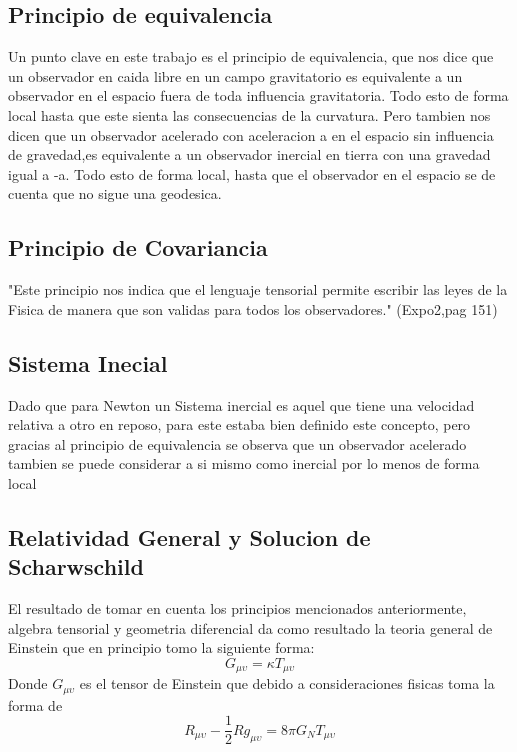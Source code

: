 \documentclass[12pt,twoside]{rif}
\begin{document}
	\subsection{Principio de equivalencia}
	Un punto clave en este trabajo es el principio de equivalencia, que nos dice que un observador en caida libre en un campo gravitatorio es equivalente a un observador en el espacio fuera de toda influencia gravitatoria. Todo esto de forma local hasta que este sienta las consecuencias de la curvatura. Pero tambien nos dicen que un observador acelerado con aceleracion a en el espacio sin influencia de gravedad,es equivalente a un observador inercial en tierra con una gravedad igual a -a. Todo esto de forma local, hasta que el observador en el espacio se de cuenta que no sigue una geodesica.
	
	\subsection{Principio de Covariancia}
	"Este principio nos indica que el lenguaje tensorial permite escribir las leyes de la Fisica de manera que son validas para todos los observadores." (Expo2,pag 151)
	\subsection{Sistema Inecial}
	Dado que para Newton un Sistema inercial es aquel que tiene una velocidad relativa a otro en reposo, para este estaba bien definido este concepto, pero gracias al principio de equivalencia se observa que un observador acelerado tambien se puede considerar a si mismo como inercial por lo menos de forma local
	\subsection{Relatividad General y Solucion de Scharwschild}
	El resultado de tomar en cuenta los principios mencionados anteriormente, algebra tensorial y geometria diferencial da como resultado la teoria general de Einstein que en principio tomo la siguiente forma:
	\begin{equation}
	G_{\mu\upsilon}=\kappa T_{\mu\upsilon}
	\end{equation}
Donde $G_{\mu\upsilon}$ es el tensor de Einstein que debido a consideraciones fisicas toma la forma de 
\begin{equation}
R_{\mu\upsilon}-\frac{1}{2}Rg_{\mu\upsilon}=8\pi G_{N}T_{\mu\upsilon}
\end{equation}	
\end{document}
